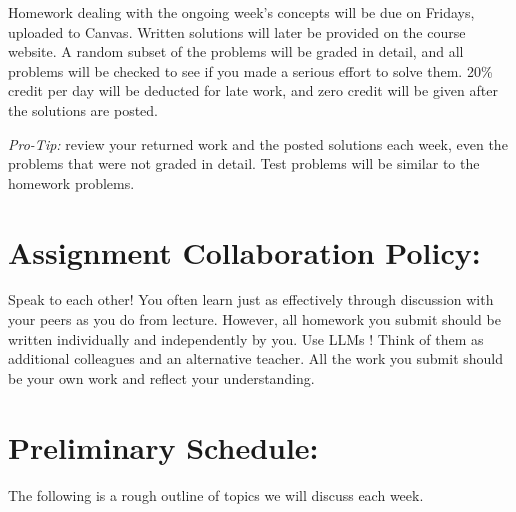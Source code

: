 \documentclass[margin,line]{res}
\begin{document}
\begin{resume}
Homework dealing with the ongoing week's concepts will be due on Fridays, uploaded to Canvas.
Written solutions will later be provided on the course website.
A random subset of the problems will be graded in detail, and all problems will be checked to see if you made a serious effort to solve them.
20\% credit per day will be deducted for late work, and zero credit will be given after the solutions are posted.

\textit{Pro-Tip:} review your returned work and the posted solutions each week, even the problems that were not graded in detail. Test problems will be similar to the homework problems.



\section{Assignment Collaboration Policy:} 

Speak to each other!
You often learn just as effectively through discussion with your peers as you do from lecture. 
However, all homework you submit should be written individually and independently by you.
Use LLMs !
Think of them as additional colleagues and an alternative teacher. 
All the work you submit should be your own work and reflect your understanding.

\clearpage

\section{Preliminary Schedule:}

%
%

%
%


The following is a rough outline of topics we will discuss each week. 


\end{resume}
\end{document}

